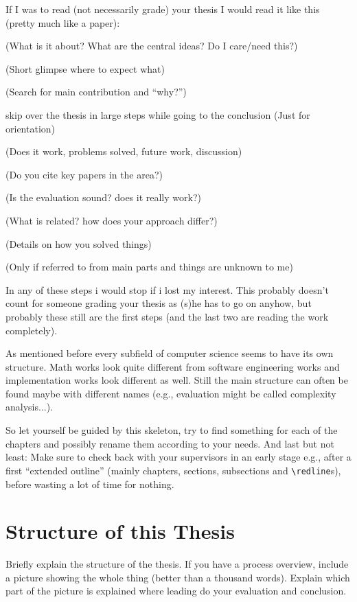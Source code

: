		If I was to read (not necessarily grade) your thesis I would read it like this (pretty much like a paper):
		\begin{description}
			\item[Abstract] (What is it about? What are the central ideas? Do I care/need this?)
			\item[Table of contents] (Short glimpse where to expect what)
			\item[Intro] (Search for main contribution and ``why?'')
			\item skip over the thesis in large steps while going to the conclusion (Just for orientation)
			\item[Conclusion] (Does it work, problems solved, future work, discussion)
			\item[References] (Do you cite key papers in the area?)
			\item[Evaluation] (Is the evaluation sound? does it really work?)
			\item[Related work] (What is related? how does your approach differ?)
			\item[Main parts] (Details on how you solved things)
			\item[Foundations] (Only if referred to from main parts and things are unknown to me)
		\end{description}
		In any of these steps i would stop if i lost my interest.
		This probably doesn't count for someone grading your thesis as (s)he has to go on anyhow, but probably these still are the first steps (and the last two are reading the work completely).
		
		As mentioned before every subfield of computer science seems to have its own structure.
		Math works look quite different from software engineering works and implementation works look different as well.
		Still the main structure can often be found maybe with different names (e.g., evaluation might be called complexity analysis...).
		
		So let yourself be guided by this skeleton, try to find something for each of the chapters and possibly rename them according to your needs.
		And last but not least: 
		Make sure to check back with your supervisors in an early stage e.g., after a first ``extended outline'' (mainly chapters, sections, subsections and \verb|\redline|s), before wasting a lot of time for nothing.
	
	\section{Structure of this Thesis}\label{sec:structure} 
		
		Briefly explain the structure of the thesis.
		If you have a process overview, include a picture showing the whole thing (better than a thousand words).
		Explain which part of the picture is explained where leading do your evaluation and conclusion.
		
